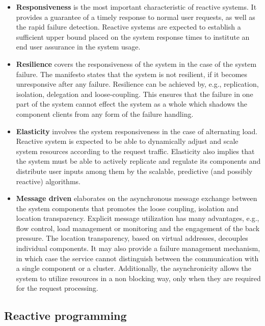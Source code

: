 \documentclass[oneside,
  digital, %
  table,   %
  lof,     %
  lot,     %
]{fithesis3}
\begin{document}
\begin{itemize}
    \item \textbf{Responsiveness} is the most important characteristic of reactive systems. It provides a guarantee of a timely response to normal user requests, as well as the rapid failure detection. Reactive systems are expected to establish a sufficient upper bound placed on the system response times to institute an end user assurance in the system usage.
    
    \item \textbf{Resilience} covers the responsiveness of the system in the case of the system failure. The manifesto states that the system is not resilient, if it becomes unresponsive after any failure. Resilience can be achieved by, e.g., replication, isolation, delegation and loose-coupling. This ensures that the failure in one part of the system cannot effect the system as a whole which shadows the component clients from any form of the failure handling.
    
    \item \textbf{Elasticity} involves the system responsiveness in the case of alternating load. Reactive system is expected to be able to dynamically adjust and scale system resources according to the request traffic. Elasticity also implies that the system must be able to actively replicate and regulate its components and distribute user inputs among them by the scalable, predictive (and possibly reactive) algorithms.
    
    \item \textbf{Message driven} elaborates on the asynchronous message exchange between the system components that promotes the loose coupling, isolation and location transparency. Explicit message utilization has many advantages, e.g., flow control, load management or monitoring and the engagement of the back pressure. The location transparency, based on virtual addresses, decouples individual components. It may also provide a failure management mechanism, in which case the service cannot distinguish between the communication with a single component or a cluster. Additionally, the asynchronicity allows the system to utilize resources in a non blocking way, only when they are required for the request processing. 
\end{itemize}

\subsection{Reactive programming}
\end{document}
